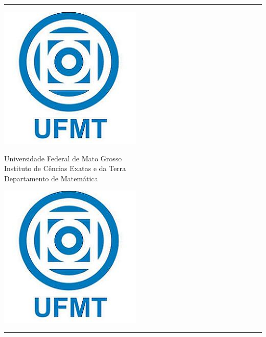 %
%
\thispagestyle{empty}

\hspace{-1.3cm}\begin{minipage}{16cm}
{\rule[0 ex]{16cm}{0.05cm}}%
\begin{center}
\begin{minipage}[s]{1.8cm}
\includegraphics[scale=0.28]{logo/logo_ufmt.jpg}
\end{minipage}\begin{minipage}[s]{11cm}\noindent
{\begin{center} {\Large Universidade Federal de Mato Grosso}\\
{Instituto de C\^encias Exatas e da Terra}\\
{\sc Departamento de Matem\'atica}
\end{center}}\end{minipage}\begin{minipage}[s]{1.8cm}
\includegraphics[scale=0.28]{logo/logo_ufmt.jpg}
\end{minipage}
\end{center}
{\rule[0 ex]{16cm}{0.05cm}}%
\end{minipage}

